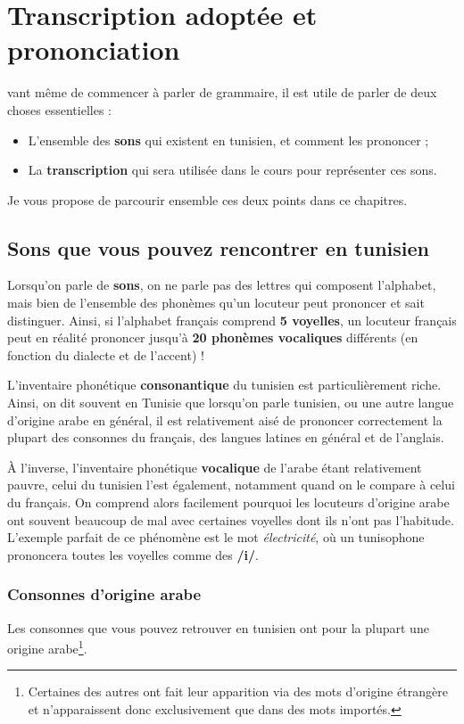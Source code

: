 \chapter{Transcription adoptée et prononciation}
vant même de commencer à parler de grammaire, il est utile de parler de deux choses essentielles : 
\begin{itemize}
    \item L'ensemble des \textbf{sons} qui existent en tunisien, et comment les prononcer ;
    \item La \textbf{transcription} qui sera utilisée dans le cours pour représenter ces sons.
\end{itemize}

Je vous propose de parcourir ensemble ces deux points dans ce chapitres.

\section{Sons que vous pouvez rencontrer en tunisien}
Lorsqu'on parle de \textbf{sons}, on ne parle pas des lettres qui composent l'alphabet, mais bien de l'ensemble des phonèmes qu'un locuteur peut prononcer et sait distinguer. Ainsi, si l'alphabet français comprend \textbf{5 voyelles}, un locuteur français peut en réalité prononcer jusqu'à \textbf{20 phonèmes vocaliques} différents (en fonction du dialecte et de l'accent) !

L'inventaire phonétique \textbf{consonantique} du tunisien est particulièrement riche. Ainsi, on dit souvent en Tunisie que lorsqu'on parle tunisien, ou une autre langue d'origine arabe en général, il est relativement aisé de prononcer correctement la plupart des consonnes du français, des langues latines en général et de l'anglais. 

À l'inverse, l'inventaire phonétique \textbf{vocalique} de l'arabe étant relativement pauvre, celui du tunisien l'est également, notamment quand on le compare à celui du français. On comprend alors facilement pourquoi les locuteurs d'origine arabe ont souvent beaucoup de mal avec certaines voyelles dont ils n'ont pas l'habitude. L'exemple parfait de ce phénomène est le mot \textit{électricité}, où un tunisophone prononcera toutes les voyelles comme des \textbf{/i/}.

\subsection{Consonnes d'origine arabe}
Les consonnes que vous pouvez retrouver en tunisien ont pour la plupart une origine arabe\footnote{Certaines des autres ont fait leur apparition via des mots d'origine étrangère et n'apparaissent donc exclusivement que dans des mots importés.}. 


